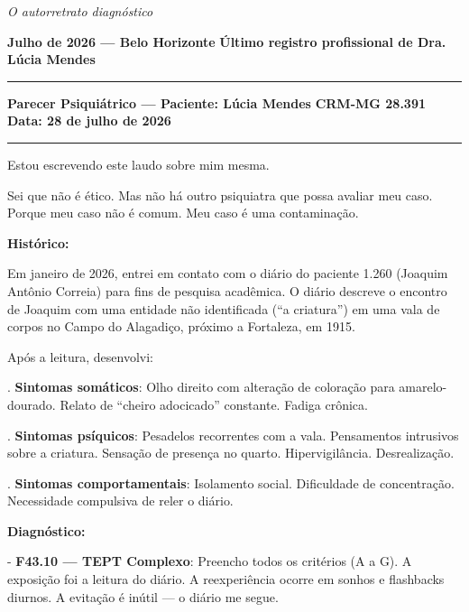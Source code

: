 
\noindent \textit{O autorretrato diagnóstico}

\noindent \textbf{Julho de 2026 --- Belo Horizonte}
\textbf{Último registro profissional de Dra. Lúcia Mendes}

\vspace{0.5em}\noindent\rule{\textwidth}{0.5pt}\vspace{0.5em}

\noindent \textbf{Parecer Psiquiátrico --- Paciente: Lúcia Mendes}
\textbf{CRM-MG 28.391}
\textbf{Data: 28 de julho de 2026}

\vspace{0.5em}\noindent\rule{\textwidth}{0.5pt}\vspace{0.5em}

\noindent Estou escrevendo este laudo sobre mim mesma.

\noindent Sei que não é ético. Mas não há outro psiquiatra que possa avaliar meu caso. Porque meu caso não é comum. Meu caso é uma contaminação.

\noindent \textbf{Histórico:}

\noindent Em janeiro de 2026, entrei em contato com o diário do paciente 1.260 (Joaquim Antônio Correia) para fins de pesquisa acadêmica. O diário descreve o encontro de Joaquim com uma entidade não identificada (\textquotedblleft{}a criatura\textquotedblright{}) em uma vala de corpos no Campo do Alagadiço, próximo a Fortaleza, em 1915.

\noindent Após a leitura, desenvolvi:

. \textbf{Sintomas somáticos}: Olho direito com alteração de coloração para amarelo-dourado. Relato de \textquotedblleft{}cheiro adocicado\textquotedblright{} constante. Fadiga crônica.

. \textbf{Sintomas psíquicos}: Pesadelos recorrentes com a vala. Pensamentos intrusivos sobre a criatura. Sensação de presença no quarto. Hipervigilância. Desrealização.

. \textbf{Sintomas comportamentais}: Isolamento social. Dificuldade de concentração. Necessidade compulsiva de reler o diário.

\noindent \textbf{Diagnóstico:}

\noindent - \textbf{F43.10 --- TEPT Complexo}: Preencho todos os critérios (A a G). A exposição foi a leitura do diário. A reexperiência ocorre em sonhos e flashbacks diurnos. A evitação é inútil --- o diário me segue.

